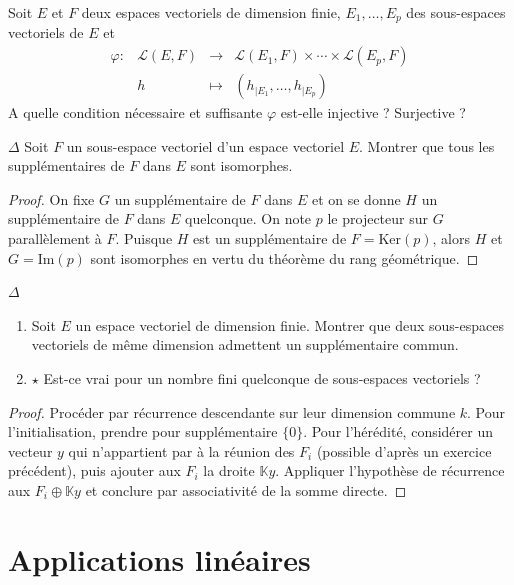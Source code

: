 \documentclass[french,a4paper]{article}
\newcommand{\K}{\mathbb{K}}
\renewcommand{\ker}{\text{Ker}}
\newcommand{\im}{\text{Im}}
\theoremstyle{plain}
\theoremstyle{definition}
\theoremstyle{remark}
\begin{document}
\begin{ex}[Moulin.EV.29]{}
	Soit $E$ et $F$ deux espaces vectoriels de dimension finie, $E_1,\ldots,E_p$ des sous-espaces vectoriels de $E$ et $$\begin{array}{lrcl}
		\varphi:&\mathcal{L}(E,F)&\longrightarrow&\mathcal{L}(E_1,F)\times\cdots\times\mathcal{L}(E_p,F) \\
		&h&\longmapsto&(h_{\mid E_1},\ldots,h_{\mid E_p})
	\end{array}$$ A quelle condition nécessaire et suffisante $\varphi$ est-elle injective ? Surjective ?
\end{ex}

\begin{ex}[Moulin.EV.30]{$\Delta$}
	Soit $F$ un sous-espace vectoriel d'un espace vectoriel $E$. Montrer que tous les supplémentaires de $F$ dans $E$ sont isomorphes.
\end{ex}
\begin{proof}
	On fixe $G$ un supplémentaire de $F$ dans $E$ et on se donne $H$ un supplémentaire de $F$ dans $E$ quelconque. On note $p$ le projecteur sur $G$ parallèlement à $F$. Puisque $H$ est un supplémentaire de $F=\ker(p)$, alors $H$ et $G=\im(p)$ sont isomorphes en vertu du théorème du rang géométrique.
\end{proof}

\begin{ex}[Moulin.EV.31]{$\Delta$}
	\begin{enumerate}
		\item Soit $E$ un espace vectoriel de dimension finie. Montrer que deux sous-espaces vectoriels de même dimension admettent un supplémentaire commun.
		\item $\star$ Est-ce vrai pour un nombre fini quelconque de sous-espaces vectoriels ?
	\end{enumerate}
\end{ex}
\begin{proof}
	Procéder par récurrence descendante sur leur dimension commune $k$. Pour l'initialisation, prendre pour supplémentaire $\{0\}$. Pour l'hérédité, considérer un vecteur $y$ qui n'appartient par à la réunion des $F_i$ (possible d'après un exercice précédent), puis ajouter aux $F_i$ la droite $\K y$. Appliquer l'hypothèse de récurrence aux $F_i\oplus\K y$ et conclure par associativité de la somme directe.
\end{proof}

\section{Applications linéaires}
\end{document}

